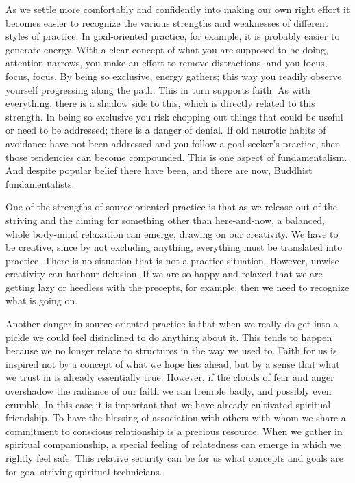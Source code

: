 As we settle more comfortably and confidently into making our own right
effort it becomes easier to recognize the various strengths and
weaknesses of different styles of practice. In goal-oriented practice,
for example, it is probably easier to generate energy. With a clear
concept of what you are supposed to be doing, attention narrows, you make an effort to remove distractions, and you focus, focus, focus. By being so
exclusive, energy gathers; this way you readily observe yourself
progressing along the path. This in turn supports faith. As with
everything, there is a shadow side to this, which is directly related to
this strength. In being so exclusive you risk chopping out things that
could be useful or need to be addressed; there is a danger of denial. If
old neurotic habits of avoidance have not been addressed and you follow
a goal-seeker's practice, then those tendencies can become compounded. This
is one aspect of fundamentalism. And despite popular belief there have
been, and there are now, Buddhist fundamentalists.

One of the strengths of source-oriented practice is that as we release
out of the striving and the aiming for something other than
here-and-now, a balanced, whole body-mind relaxation can emerge,
drawing on our creativity.
We have to be creative, since by not excluding
anything, everything must be translated into practice. There is no
situation that is not a practice-situation. However, unwise creativity
can harbour delusion. If we are so happy and relaxed that we are getting
lazy or heedless with the precepts, for example, then we need to
recognize what is going on.

Another danger in source-oriented practice is that when we really do get
into a pickle we could feel disinclined to do anything about it. This
tends to happen because we no longer relate to structures in the way we
used to. Faith for us is inspired not by a concept of what we hope lies
ahead, but by a sense that what we trust in is already essentially true.
However, if the clouds of fear and anger overshadow the radiance of our
faith we can tremble badly, and possibly even crumble. In this case it
is important that we have already cultivated spiritual friendship. To
have the blessing of association with others with whom we share a
commitment to conscious relationship is a precious resource. When we
gather in spiritual companionship, a special feeling of relatedness can
emerge in which we rightly feel safe. This relative security can be for
us what concepts and goals are for goal-striving spiritual technicians.

